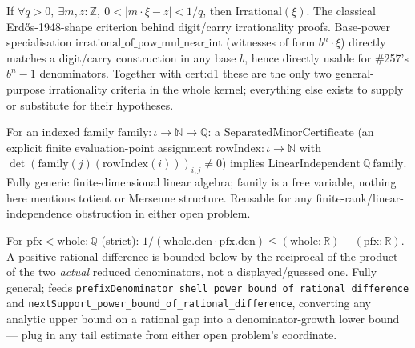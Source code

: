 \begin{prop}
If $\forall q>0,\ \exists m,z:\mathbb{Z},\ 0 < |m\cdot\xi - z| < 1/q$, then $\mathrm{Irrational}(\xi)$. The classical Erd\H{o}s-1948-shape criterion behind digit/carry irrationality proofs. Base-power specialisation $\mathrm{irrational\_of\_pow\_mul\_near\_int}$ (witnesses of form $b^n\cdot\xi$) directly matches a digit/carry construction in any base $b$, hence directly usable for \#257's $b^n-1$ denominators. Together with cert:d1 these are the only two general-purpose irrationality criteria in the whole kernel; everything else exists to supply or substitute for their hypotheses.
\par\noindent{}    
\end{prop}

\begin{prop}
For an indexed family $\mathrm{family}: \iota\to\mathbb{N}\to\mathbb{Q}$: a $\mathrm{SeparatedMinorCertificate}$ (an explicit finite evaluation-point assignment $\mathrm{rowIndex}:\iota\to\mathbb{N}$ with $\det(\mathrm{family}(j)(\mathrm{rowIndex}(i)))_{i,j} \ne 0$) implies $\mathrm{LinearIndependent}\ \mathbb{Q}\ \mathrm{family}$. Fully generic finite-dimensional linear algebra; $\mathrm{family}$ is a free variable, nothing here mentions totient or Mersenne structure. Reusable for any finite-rank/linear-independence obstruction in either open problem.
\par\noindent{}    
\end{prop}

\begin{prop}
For $\mathrm{pfx} < \mathrm{whole}:\mathbb{Q}$ (strict): $1/(\mathrm{whole.den}\cdot\mathrm{pfx.den}) \le (\mathrm{whole}:\mathbb{R}) - (\mathrm{pfx}:\mathbb{R})$. A positive rational difference is bounded below by the reciprocal of the product of the two \emph{actual} reduced denominators, not a displayed/guessed one. Fully general; feeds \texttt{prefixDenominator\_shell\_power\_bound\_of\_rational\_difference} and \texttt{nextSupport\_power\_bound\_of\_rational\_difference}, converting any analytic upper bound on a rational gap into a denominator-growth lower bound — plug in any tail estimate from either open problem's coordinate.
\par\noindent{}   
\end{prop}

